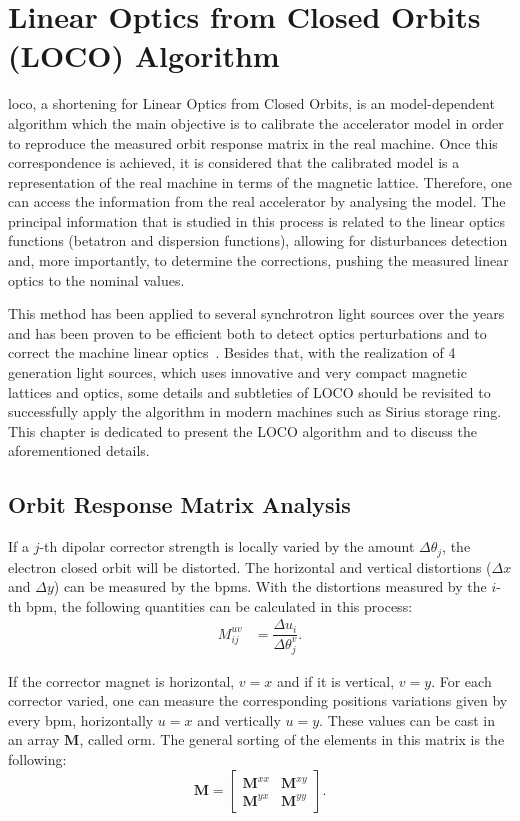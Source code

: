 \chapter{Linear Optics from Closed Orbits (LOCO) Algorithm}

\gls{loco}, a shortening for Linear Optics from Closed Orbits, is an model-dependent algorithm which the main objective is to calibrate the accelerator model in order to reproduce the measured orbit response matrix in the real machine. Once this correspondence is achieved, it is considered that the calibrated model is a representation of the real machine in terms of the magnetic lattice. Therefore, one can access the information from the real accelerator by analysing the model. The principal information that is studied in this process is related to the linear optics functions (betatron and dispersion functions), allowing for disturbances detection and, more importantly, to determine the corrections, pushing the measured linear optics to the nominal values.

This method has been applied to several synchrotron light sources over the years and has been proven to be efficient both to detect optics perturbations and to correct the machine linear optics~\cite{safranek1997, icfa_laurent, icfa_australia}. Besides that, with the realization of 4 generation light sources, which uses innovative and very compact magnetic lattices and optics, some details and subtleties of LOCO should be revisited to successfully apply the algorithm in modern machines such as Sirius storage ring. This chapter is dedicated to present the LOCO algorithm and to discuss the aforementioned details.
\section{Orbit Response Matrix Analysis}\label{sec:orm_analysis}
If a $j$-th dipolar corrector strength is locally varied by the amount $\Delta \theta_j$, the electron closed orbit will be distorted. The horizontal and vertical distortions ($\Delta x$ and $\Delta y$) can be measured by the \gls{bpm}s. With the distortions measured by the $i$-th \gls{bpm}, the following quantities can be calculated in this process:
\begin{align}
    M^{uv}_{ij} &= \dfrac{\Delta u_i}{\Delta \theta_j^v}.
\end{align}

If the corrector magnet is horizontal, $v=x$ and if it is vertical, $v=y$. For each corrector varied, one can measure the corresponding positions variations given by every \gls{bpm}, horizontally $u=x$ and vertically $u=y$. These values can be cast in an array $\mathbf{M}$, called \gls{orm}. The general sorting of the elements in this matrix is the following:
\begin{equation}
    \mathbf{M} = \begin{bmatrix}
    \mathbf{M}^{xx} & \mathbf{M}^{xy} \\
    \mathbf{M}^{yx} & \mathbf{M}^{yy} 
\end{bmatrix}.
\end{equation}

